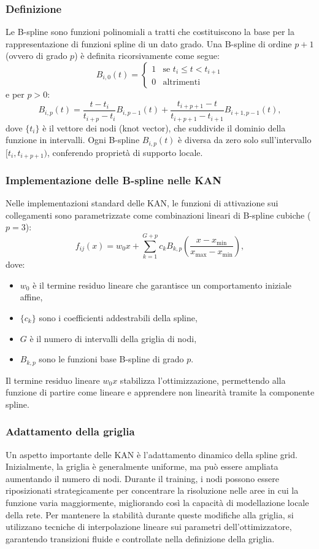 \documentclass[a4paper,12pt]{report}
\begin{document}
	\subsubsection{Definizione}
	Le B-spline sono funzioni polinomiali a tratti che costituiscono la base per la rappresentazione di funzioni spline di un dato grado. Una B-spline di ordine \(p+1\) (ovvero di grado \(p\)) è definita ricorsivamente come segue:
	\[
	B_{i,0}(t) = \begin{cases}
		1 & \text{se } t_i \leq t < t_{i+1} \\
		0 & \text{altrimenti}
	\end{cases}
	\]
	e per \(p > 0\):
	\[
	B_{i,p}(t) = \frac{t - t_i}{t_{i+p} - t_i} B_{i,p-1}(t) + \frac{t_{i+p+1} - t}{t_{i+p+1} - t_{i+1}} B_{i+1,p-1}(t),
	\]
	dove \(\{t_i\}\) è il vettore dei nodi (knot vector), che suddivide il dominio della funzione in intervalli. Ogni B-spline \(B_{i,p}(t)\) è diversa da zero solo sull'intervallo \([t_i, t_{i+p+1})\), conferendo proprietà di supporto locale.
	
	\subsubsection{Implementazione delle B-spline nelle KAN}
	
	Nelle implementazioni standard delle KAN, le funzioni di attivazione sui collegamenti sono parametrizzate come combinazioni lineari di B-spline cubiche (\(p=3\)):
	\[
	f_{ij}(x) = w_0 x + \sum_{k=1}^{G+p} c_k B_{k,p}\left(\frac{x - x_{\min}}{x_{\max} - x_{\min}}\right),
	\]
	dove:
	\begin{itemize}
		\item \(w_0\) è il termine residuo lineare che garantisce un comportamento iniziale affine,
		\item \(\{c_k\}\) sono i coefficienti addestrabili della spline,
		\item \(G\) è il numero di intervalli della griglia di nodi,
		\item \(B_{k,p}\) sono le funzioni base B-spline di grado \(p\).
	\end{itemize}
	Il termine residuo lineare \(w_0 x\) stabilizza l’ottimizzazione, permettendo alla funzione di partire come lineare e apprendere non linearità tramite la componente spline.
	
	\subsubsection{Adattamento della griglia}
	Un aspetto importante delle KAN è l’adattamento dinamico della spline grid. Inizialmente, la griglia è generalmente uniforme, ma può essere ampliata aumentando il numero di nodi. Durante il training, i nodi possono essere riposizionati strategicamente per concentrare la risoluzione nelle aree in cui la funzione varia maggiormente, migliorando così la capacità di modellazione locale della rete. Per mantenere la stabilità durante queste modifiche alla griglia, si utilizzano tecniche di interpolazione lineare sui parametri dell’ottimizzatore, garantendo transizioni fluide e controllate nella definizione della griglia.
	
\end{document}
